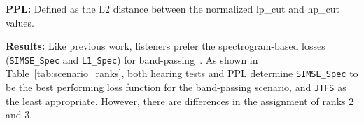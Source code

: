 \documentclass{article}
\newcommand{\SIMSESpec}{\texttt{SIMSE\_\allowbreak Spec}\xspace}
\newcommand{\LoneSpec}{\texttt{L1\_\allowbreak Spec}\xspace}
\newcommand{\JTFS}{\texttt{JTFS}\xspace}
\begin{document}
 \noindent \textbf{PPL:} Defined as the L2 distance between the normalized lp\_cut and hp\_cut values. 

\noindent \textbf{Results:} Like previous work, listeners prefer the spectrogram-based losses (\SIMSESpec and \LoneSpec) for band-passing~\cite{salimi2025evaluating}. As shown in Table~\ref{tab:scenario_ranks}, both hearing tests and PPL determine \SIMSESpec to be the best performing loss function for the band-passing scenario, and \JTFS as the least appropriate. However, there are differences in the assignment of ranks 2 and 3.


\begin{table}[tbhp]
\centering
\small
\setlength{\tabcolsep}{4pt}
\renewcommand{\arraystretch}{1.15}
\caption{Summary of ranks across seven scenarios using two evaluation measures: bootstrapped PPL and bootstrapped hearing survey ratings. Lower rank indicates better performance. Top row shows ICC3 inter-rater reliability scores between the listeners.}
\label{tab:scenario_ranks}
\end{table}
\end{document}
